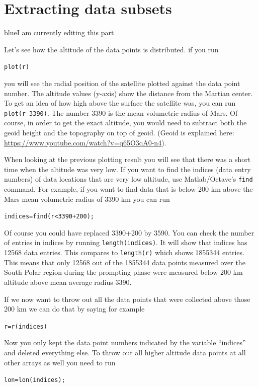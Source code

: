 \documentclass[11pt]{article}
\newcommand{\HERE}{\begin{color}{blue}I am currently editing this part\end{color}}
\begin{document}

\section{Extracting data subsets}


\HERE

Let's see how the altitude of the data points is distributed. if you run

\qquad \verb+plot(r)+

you will see the radial position of the satellite plotted against the data point number. The altitude values (y-axis) show the distance from the Martian center. To get an idea of how high above the surface the satellite was, you can run \verb+plot(r-3390)+. The number 3390 is the mean volumetric radius of Mars. Of course, in order to get the exact altitude, you would need to subtract both the geoid height and the topography on top of geoid. (Geoid is explained here: \url{https://www.youtube.com/watch?v=q65O3qA0-n4}).


When looking at the previous plotting result you will see that there was a short time when the altitude was very low.  If you want to find the indices (data entry numbers) of data locations that are very low altitude, use Matlab/Octave's \verb+find+ command. For example, if you want to find data that is below 200 km above the Mars mean volumetric radius of 3390 km you can run

\qquad \verb~indices=find(r<3390+200);~

Of course you could have replaced 3390+200 by 3590. You can check the number of entries in indices by running \verb+length(indices)+. It will show that indices has 12568 data entries. This compares to \verb+length(r)+ which shows 1855344 entries. This means that only 12568 out of the 1855344 data points measured over the South Polar region during the prompting phase were measured below 200 km altitude above mean average radius 3390.

If we now want to throw out all the data points that were collected above those 200 km we can do that by saying for example 

\qquad \verb+r=r(indices)+

Now you only kept the data point numbers indicated by the variable ``indices'' and deleted everything else. To throw out all higher altitude data points at all other arrays as well you need to run 

\qquad \verb+lon=lon(indices);+
\end{document}
